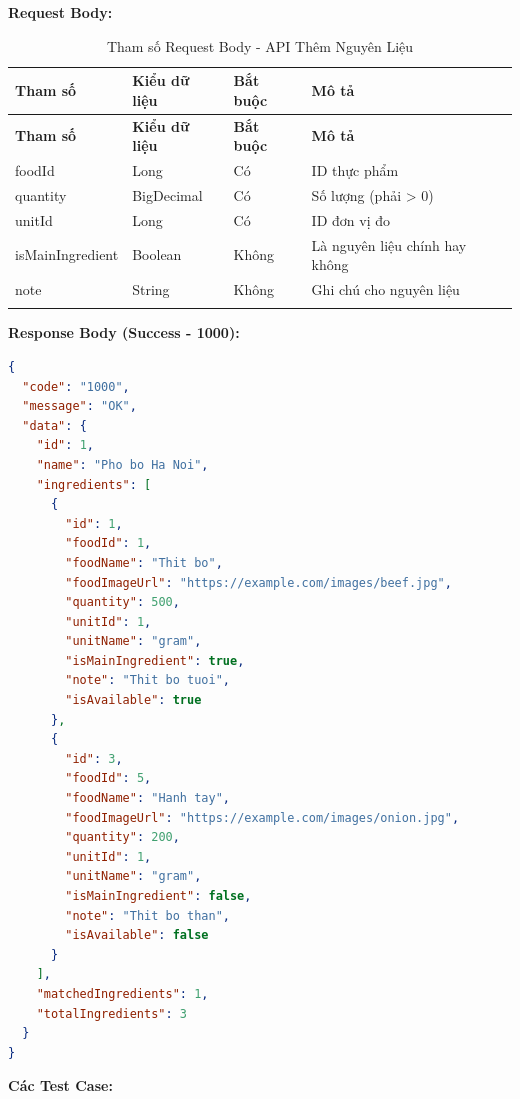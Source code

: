 \textbf{Request Body:}

\small
\begin{longtable}{|>{\raggedright\arraybackslash}p{3.5cm}|>{\raggedright\arraybackslash}p{2.5cm}|>{\raggedright\arraybackslash}p{2cm}|>{\raggedright\arraybackslash}p{5.5cm}|}
\hline
\textbf{Tham số} & \textbf{Kiểu dữ liệu} & \textbf{Bắt buộc} & \textbf{Mô tả} \\
\hline
\endfirsthead
\hline
\textbf{Tham số} & \textbf{Kiểu dữ liệu} & \textbf{Bắt buộc} & \textbf{Mô tả} \\
\hline
\endhead
foodId & Long & Có & ID thực phẩm \\
\hline
quantity & BigDecimal & Có & Số lượng (phải > 0) \\
\hline
unitId & Long & Có & ID đơn vị đo \\
\hline
isMainIngredient & Boolean & Không & Là nguyên liệu chính hay không \\
\hline
note & String & Không & Ghi chú cho nguyên liệu \\
\hline
\caption{Tham số Request Body - API Thêm Nguyên Liệu}
\end{longtable}

\textbf{Response Body (Success - 1000):}

\begin{lstlisting}[language=json, caption=Response thanh cong API 4.6]
{
  "code": "1000",
  "message": "OK",
  "data": {
    "id": 1,
    "name": "Pho bo Ha Noi",
    "ingredients": [
      {
        "id": 1,
        "foodId": 1,
        "foodName": "Thit bo",
        "foodImageUrl": "https://example.com/images/beef.jpg",
        "quantity": 500,
        "unitId": 1,
        "unitName": "gram",
        "isMainIngredient": true,
        "note": "Thit bo tuoi",
        "isAvailable": true
      },
      {
        "id": 3,
        "foodId": 5,
        "foodName": "Hanh tay",
        "foodImageUrl": "https://example.com/images/onion.jpg",
        "quantity": 200,
        "unitId": 1,
        "unitName": "gram",
        "isMainIngredient": false,
        "note": "Thit bo than",
        "isAvailable": false
      }
    ],
    "matchedIngredients": 1,
    "totalIngredients": 3
  }
}
\end{lstlisting}

\textbf{Các Test Case:}

